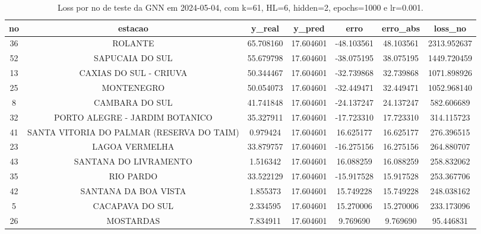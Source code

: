 \begin{table}[h]
\centering
\caption{Loss por no de teste da GNN em 2024-05-04, com k=61, HL=6, hidden=2, epochs=1000 e lr=0.001.}
\label{tab:gnn_loss_k61_hl6_h2_e1000_d20240504}
\begin{tabular}{ccccccc}
\toprule
no & estacao & y\_real & y\_pred & erro & erro\_abs & loss\_no \\
\midrule
36 & ROLANTE & 65.708160 & 17.604601 & -48.103561 & 48.103561 & 2313.952637 \\
52 & SAPUCAIA DO SUL & 55.679798 & 17.604601 & -38.075195 & 38.075195 & 1449.720459 \\
13 & CAXIAS DO SUL - CRIUVA & 50.344467 & 17.604601 & -32.739868 & 32.739868 & 1071.898926 \\
25 & MONTENEGRO & 50.054073 & 17.604601 & -32.449471 & 32.449471 & 1052.968140 \\
8 & CAMBARA DO SUL & 41.741848 & 17.604601 & -24.137247 & 24.137247 & 582.606689 \\
32 & PORTO ALEGRE - JARDIM BOTANICO & 35.327911 & 17.604601 & -17.723310 & 17.723310 & 314.115723 \\
41 & SANTA VITORIA DO PALMAR (RESERVA DO TAIM) & 0.979424 & 17.604601 & 16.625177 & 16.625177 & 276.396515 \\
23 & LAGOA VERMELHA & 33.879757 & 17.604601 & -16.275156 & 16.275156 & 264.880707 \\
43 & SANTANA DO LIVRAMENTO & 1.516342 & 17.604601 & 16.088259 & 16.088259 & 258.832062 \\
35 & RIO PARDO & 33.522129 & 17.604601 & -15.917528 & 15.917528 & 253.367706 \\
42 & SANTANA DA BOA VISTA & 1.855373 & 17.604601 & 15.749228 & 15.749228 & 248.038162 \\
5 & CACAPAVA DO SUL & 2.334595 & 17.604601 & 15.270006 & 15.270006 & 233.173096 \\
26 & MOSTARDAS & 7.834911 & 17.604601 & 9.769690 & 9.769690 & 95.446831 \\
\bottomrule
\end{tabular}
\end{table}
